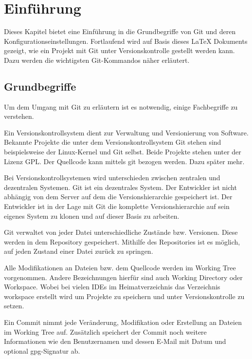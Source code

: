 \label{sec:einfuehrung}
\section{Einführung}
Dieses Kapitel bietet eine Einführung in die Grundbegriffe von Git und deren Konfigurationseinstellungen. Fortlaufend wird auf Basis dieses \LaTeX{} Dokuments gezeigt, wie ein Projekt mit Git unter Versionskontrolle gestellt werden kann. Dazu werden die wichtigsten Git-Kommandos näher erläutert.

\label{sec:einfuehrung.grundbegriffe}
\subsection{Grundbegriffe}
Um dem Umgang mit Git zu erläutern ist es notwendig, einige Fachbegriffe zu verstehen. 

Ein Versionskontrollsystem dient zur Verwaltung und Versionierung von Software. Bekannte Projekte die unter dem Versionskontrollsystem Git stehen sind beispielsweise der Linux-Kernel und Git selbst. Beide Projekte stehen unter der Lizenz GPL. Der Quellcode kann mittels git bezogen werden. Dazu später mehr.

Bei Versionskontrollsystemen wird unterschieden zwischen zentralen und dezentralen Systemen. Git ist ein dezentrales System. Der Entwickler ist nicht abhängig von dem Server auf dem die Versionshierarchie gespeichert ist. Der Entwickler ist in der Lage mit Git die komplette Versionshierarchie auf sein eigenes System zu klonen und auf dieser Basis zu arbeiten.   

Git  verwaltet von jeder Datei unterschiedliche Zustände bzw. Versionen. Diese werden in dem Repository gespeichert. Mithilfe des Repositories ist es möglich, auf jeden Zustand einer Datei zurück zu springen.

Alle Modifikationen an Dateien bzw. dem Quellcode werden im Working Tree vorgenommen. Andere Bezeichnungen hierfür sind auch Working Directory oder Workspace. Wobei bei vielen IDEs im Heimatverzeichnis das Verzeichnis workspace erstellt wird um Projekte zu speichern und unter Versionskontrolle zu setzen. 

Ein Commit nimmt jede Veränderung, Modifikation oder Erstellung an Dateien im Working Tree auf. Zusätzlich speichert der Commit noch weitere Informationen wie den Benutzernamen und dessen E-Mail mit Datum und optional gpg-Signatur ab.  


